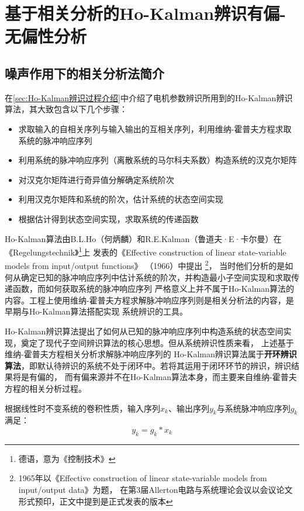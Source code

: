 \newpage
\section{基于相关分析的Ho-Kalman辨识有偏-无偏性分析}
\label{sec:基于相关分析的Ho-Kalman辨识有偏-无偏性分析}
\subsection{噪声作用下的相关分析法简介\label{sec:噪声作用下的相关分析法简介}}
在\ref{sec:Ho-Kalman辨识过程介绍}中介绍了电机参数辨识所用到的Ho-Kalman辨识算法，其大致包含以下几个步骤：
\begin{itemize}
    \item 求取输入的自相关序列与输入输出的互相关序列，利用维纳-霍普夫方程求取系统的脉冲响应序列
    \item 利用系统的脉冲响应序列（离散系统的马尔科夫系数）构造系统的汉克尔矩阵
    \item 对汉克尔矩阵进行奇异值分解确定系统阶次
    \item 利用汉克尔矩阵和系统的阶次，估计系统的状态空间实现
    \item 根据估计得到状态空间实现，求取系统的传递函数
\end{itemize}

Ho-Kalman算法由B.L.Ho（何炳麟）和R.E.Kalman（鲁道夫·E·卡尔曼）在《Regelungstechnik》\footnote{德语，意为《控制技术》}上
发表的《Effective construction of linear state-variable models from input/output functions》
（1966）中提出
\footnote{1965年以《Effective construction of linear state-variable models from input/output data》为题，
在第3届Allerton电路与系统理论会议以会议论文形式预印，正文中提到是正式发表的版本}，
当时他们分析的是如何从确定已知的脉冲响应序列中估计系统的阶次，并构造最小子空间实现和求取传递函数，而如何获取系统的脉冲响应序列
严格意义上并不属于Ho-Kalman算法的内容。工程上使用维纳-霍普夫方程求解脉冲响应序列则是相关分析法的内容，是早期与Ho-Kalman算法搭配实现
系统辨识的工具。

Ho-Kalman辨识算法提出了如何从已知的脉冲响应序列中构造系统的状态空间实现，奠定了现代子空间辨识算法的核心思想。但从系统辨识性质来看，
上述基于维纳-霍普夫方程相关分析求解脉冲响应序列的
Ho-Kalman辨识算法属于\textbf{开环辨识算法}，即默认待辨识的系统不处于闭环中。若将其运用于闭环环节的辨识，辨识结果将是有偏的，
而有偏来源并不在Ho-Kalman算法本身，而主要来自维纳-霍普夫方程的相关分析过程。

根据线性时不变系统的卷积性质，输入序列\(x_k\)、输出序列\(y_k\)与系统脉冲响应序列\(g_k\)满足：
\begin{equation*}
    y_k = g_k * x_k
\end{equation*}

